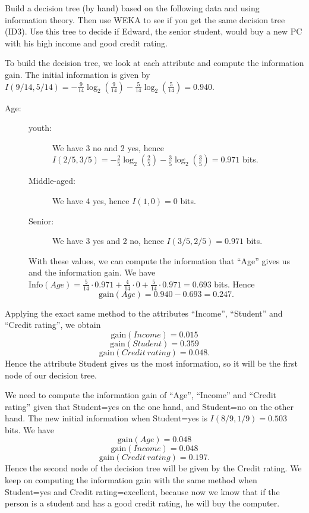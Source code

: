 \documentclass[fontsize=12pt, usenames, dvipsnames, headinclude, headsepline, footinclude, footsepline]{scrartcl}
\begin{document}
\begin{exo}
  Build a decision tree (by hand) based on the following data and using information theory. Then use WEKA to
  see if you get the same decision tree (ID3). Use this tree to decide if Edward, the senior student, would
  buy a new PC with his high income and good credit rating.
\end{exo}

  \begin{sol}
    To build the decision tree, we look at each attribute and compute the information gain. The initial
    information is given by $I(9/14, 5/14) = -\frac{9}{14} \log_2 \left(\frac{9}{14}\right) - \frac{5}{14}
    \log_2 \left(\frac{5}{14}\right) = 0.940$.
    \begin{description}
    \item[Age:]
      \begin{description}
      \item[youth:] We have 3 no and 2 yes, hence $I(2/5, 3/5) = -\frac{2}{5} \log_2 \left(\frac{2}{5}\right) -
        \frac{3}{5} \log_2 \left(\frac{3}{5}\right) = 0.971$ bits.
      \item[Middle-aged:] We have 4 yes, hence $I(1, 0) = 0$ bits.
      \item[Senior:] We have 3 yes and 2 no, hence $I(3/5, 2/5) = 0.971$ bits.
      \end{description}
      With these values, we can compute the information that ``Age'' gives us and the information gain. We
      have $\mathrm{Info}(Age) = \frac{5}{14} \cdot 0.971 + \frac{4}{14} \cdot 0 + \frac{5}{14} \cdot 0.971 =
      0.693$ bits. Hence
      \[\mathrm{gain}(Age) = 0.940 - 0.693 = 0.247.\]
    \end{description}
    Applying the exact same method to the attributes ``Income'', ``Student'' and ``Credit rating'', we obtain 
    \[\mathrm{gain}(Income) = 0.015\]
    \[\mathrm{gain}(Student) = 0.359\]
    \[\mathrm{gain}(Credit\ rating) = 0.048.\]
    Hence the attribute Student gives us the most information, so it will be the first node of our decision
    tree.

    We need to compute the information gain of ``Age'', ``Income'' and ``Credit rating'' given that
    Student=yes on the one hand, and Student=no on the other hand. The new initial information when Student=yes is $I(8/9, 1/9)
    = 0.503$ bits. We have
    \[\mathrm{gain}(Age) = 0.048\]
    \[\mathrm{gain}(Income) = 0.048\]
    \[\mathrm{gain}(Credit\ rating) = 0.197.\]
    Hence the second node of the decision tree will be given by the Credit rating. We keep on computing the
    information gain with the same method when Student=yes and Credit rating=excellent, because now we know
    that if the person is a student and has a good credit rating, he will buy the computer.


\end{sol}
\end{document}
